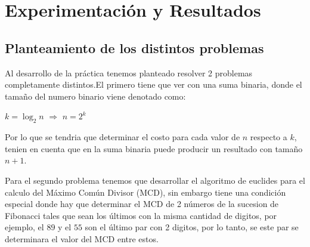 \documentclass[12pt,twoside]{article}
\begin{document}
\section{Experimentaci\'on y Resultados}
\subsection{\textbf{Planteamiento de los distintos problemas}}
Al desarrollo de la pr\'actica tenemos planteado resolver 2 problemas completamente distintos.El primero tiene que ver con
una suma binaria, donde el tamaño del numero binario viene denotado como:
\begin{center}
  $k = \log_{2}n$ $\Rightarrow$ $n = 2^k$
\end{center}
Por lo que se tendria que determinar el costo para cada valor de $n$ respecto a $k$, tenien en cuenta que en la suma binaria
puede producir un resultado con tamaño $n + 1$.

\centerline{}
Para el segundo problema tenemos que desarrollar el algoritmo de euclides para el calculo del M\'aximo Com\'un Divisor (MCD), 
sin embargo tiene una condici\'on especial donde hay que determinar el MCD de 2 n\'umeros de la sucesion de Fibonacci tales que 
sean los \'ultimos con la misma cantidad de digitos, por ejemplo, el $89$ y el $55$ son el \'ultimo par con 2 digitos, por lo tanto,
se este par se determinara el valor del MCD entre estos.
\end{document}
